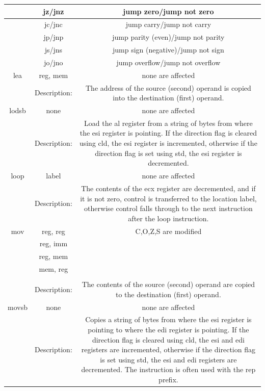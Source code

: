 \documentclass[10pt]{book}
\begin{document}
\begin{center}
\begin{tabular}{|c|c|c|}
\hline
 & jz/jnz & jump zero/jump not zero \\
\hline
 & jc/jnc & jump carry/jump not carry \\
\hline
 & jp/jnp & jump parity (even)/jump not parity \\
\hline
 & js/jns & jump sign (negative)/jump not sign \\
\hline
 & jo/jno & jump overflow/jump not overflow \\
\hline
lea & reg, mem & none are affected \\
\hline
 & Description: & The address of the source (second) operand is copied into the destination (first) operand. \\
\hline
lodsb & none & none are affected \\
\hline
 & Description: & Load the al register from a string of bytes from where the esi register is pointing. If the direction flag is cleared using cld, the esi register is incremented, otherwise if the direction flag is set using std, the esi register is decremented. \\
\hline
loop & label & none are affected \\
\hline
 & Description: & The contents of the ecx register are decremented, and if it is not zero, control is transferred to the location label, otherwise control falls through to the next instruction after the loop instruction. \\
\hline
mov & reg, reg & C,O,Z,S are modified \\
\hline
 & reg, imm &  \\
\hline
 & reg, mem &  \\
\hline
 & mem, reg &  \\
\hline
 &  &  \\
\hline
 & Description: & The contents of the source (second) operand are copied to the destination (first) operand. \\
\hline
movsb & none & none are affected \\
\hline
 & Description: & Copies a string of bytes from where the esi register is pointing to where the edi register is pointing. If the direction flag is cleared using cld, the esi and edi registers are incremented, otherwise if the direction flag is set using std, the esi and edi registers are decremented. The instruction is often used with the rep prefix. \\
\hline
\end{tabular}
\end{center}
\end{document}
